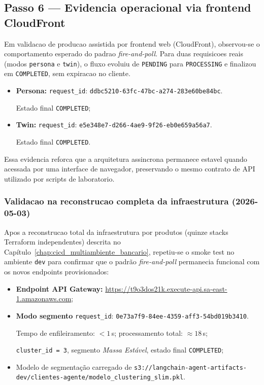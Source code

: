 \subsection{Passo 6 --- Evidencia operacional via frontend CloudFront}

Em validacao de producao assistida por frontend web (CloudFront), observou-se
o comportamento esperado do padrao \textit{fire-and-poll}. Para duas
requisicoes reais (modos \texttt{persona} e \texttt{twin}), o fluxo evoluiu de
\texttt{PENDING} para \texttt{PROCESSING} e finalizou em \texttt{COMPLETED},
sem expiracao no cliente.

\begin{itemize}[leftmargin=*]
  \item \textbf{Persona:} \texttt{request\_id}: \nolinkurl{ddbc5210-63fc-47bc-a274-283e60be84bc}. \par
        Estado final \texttt{COMPLETED};
  \item \textbf{Twin:} \texttt{request\_id}: \nolinkurl{e5e348e7-d266-4ae9-9f26-eb0e659a56a7}. \par
        Estado final \texttt{COMPLETED}.
\end{itemize}

Essa evidencia reforca que a arquitetura assincrona permanece estavel quando
acessada por uma interface de navegador, preservando o mesmo contrato de API
utilizado por scripts de laboratorio.

\subsubsection*{Validacao na reconstrucao completa da infraestrutura (2026-05-03)}

Apos a reconstrucao total da infraestrutura por produtos (quinze stacks Terraform
independentes) descrita no Cap\'itulo~\ref{chap:cicd_multiambiente_bancario},
repetiu-se o smoke test no ambiente \texttt{dev} para confirmar que o padr\~ao
\textit{fire-and-poll} permanecia funcional com os novos endpoints provisionados:

\begin{itemize}[leftmargin=*]
  \item \textbf{Endpoint API Gateway:}
        \url{https://t9o3dos21k.execute-api.sa-east-1.amazonaws.com};
  \item \textbf{Modo segmento} \textemdash \texttt{request\_id}:
        \nolinkurl{0e73a7f9-84ee-4359-aff3-54bd019b3410}. \par
        Tempo de enfileiramento: $< 1$\,s; processamento total: $\approx 18$\,s; \par
        \texttt{cluster\_id = 3}, segmento \emph{Massa Est\'{a}vel},
        estado final \texttt{COMPLETED};
  \item Modelo de segmenta\c{c}\~ao carregado de
        \texttt{s3://langchain-agent-artifacts-dev/\allowbreak{}clientes-agente/modelo\_clustering\_slim.pkl}.
\end{itemize}

